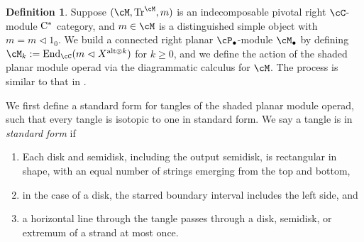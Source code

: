 \documentclass[11pt]{article}
\theoremstyle{plain}
\theoremstyle{definition}
\newtheorem{defn}[thm]{Definition}
\DeclareMathOperator{\End}{End}
\DeclareMathOperator{\Tr}{Tr}
\newcommand{\Cstar}{\rm{C^*}}
\begin{document}
\begin{defn}
Suppose $(\cM, \Tr^\cM, m)$ is an indecomposable pivotal right $\cC$-module $\Cstar$ category, and $m\in \cM$ is a distinguished simple object with $m= m \vartriangleleft 1_0$.
 We build a connected right planar $\cP_\bullet$-module $\cM_\bullet$ by defining $\cM_k := \End_\cC( m \vartriangleleft X^{\text{alt}\otimes k})$ for $k\geq 0$, and we define the action of the shaded planar module operad via the diagrammatic calculus for $\cM$. The process is similar to that in \cite[Def.~3.2]{MR2812459}.
 
We first define a standard form for tangles of the shaded planar module operad, such that every tangle is isotopic to one in standard form. We say a tangle is in \textit{standard form} if 
\begin{enumerate}[label={\rm(SF\arabic*)}]
 \item Each disk and semidisk, including the output semidisk, is rectangular in shape, with an equal number of strings emerging from the top and bottom,
 \item in the case of a disk, the starred boundary interval includes the left side, and 
 \item a horizontal line through the tangle passes through a disk, semidisk, or extremum of a strand at most once. 
\end{enumerate}


\end{defn}
\end{document}
